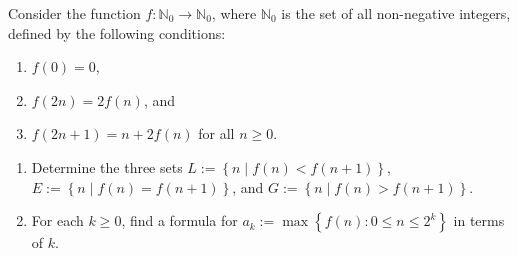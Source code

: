 Consider the function $f:\mathbb{N}_0\to\mathbb{N}_0$, where $\mathbb{N}_0$ is the set of all non-negative integers, defined by the following conditions:

\noindent\qquad\begin{minipage}{0.5\linewidth}
\begin{enumerate}[label = (\roman*)]
	\item $f\left(0\right)=0$,
	\item $f\left(2n\right)=2f\left(n\right)$, and
	\item $f\left(2n+1\right)=n+2f\left(n\right)$ for all $n\geq0$.
\end{enumerate}
\end{minipage}

\begin{enumerate}[label=(\alph*)]
	\item Determine the three sets $L:=\left\{n\mid f\left(n\right)<f\left(n+1\right)\right\}$, $E:=\left\{n\mid f\left(n\right)=f\left(n+1\right)\right\}$, and $G:=\left\{n\mid f\left(n\right)>f\left(n+1\right)\right\}$.
	\item For each $k\geq0$, find a formula for $a_k:=\max\left\{f\left(n\right):0\leq n\leq2^k\right\}$ in terms of $k$.
\end{enumerate}
